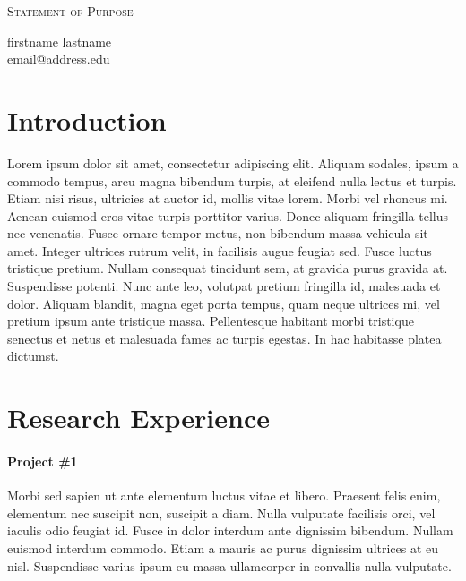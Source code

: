\documentclass[letterpaper]{article}
\makeatletter
\newcommand{\soptitle}{Statement of Purpose}
\newcommand{\yourname}{firstname lastname}
\newcommand{\youremail}{email@address.edu}
\newcommand{\amper}{{\fontspec[Scale=.95]{Adobe Caslon Pro}\selectfont\itshape\&~{}}}
\makeatother
\begin{document}
\begin{center}{\huge \scshape \soptitle}\end{center}
\begin{center}\vspace{0.2em} {\Large \yourname\\}
  {\youremail}\end{center}

\section*{Introduction}
Lorem ipsum dolor sit amet, consectetur adipiscing elit. Aliquam
sodales, ipsum a commodo tempus, arcu magna bibendum turpis, at
eleifend nulla lectus et turpis. Etiam nisi risus, ultricies at auctor
id, mollis vitae lorem. Morbi vel rhoncus mi. Aenean euismod eros
vitae turpis porttitor varius. Donec aliquam fringilla tellus nec
venenatis. Fusce ornare tempor metus, non bibendum massa vehicula sit
amet. Integer ultrices rutrum velit, in facilisis augue feugiat sed.
Fusce luctus tristique pretium. Nullam consequat tincidunt sem, at
gravida purus gravida at. Suspendisse potenti. Nunc ante leo, volutpat
pretium fringilla id, malesuada et dolor. Aliquam blandit, magna eget
porta tempus, quam neque ultrices mi, vel pretium ipsum ante tristique
massa. Pellentesque habitant morbi tristique senectus et netus et
malesuada fames ac turpis egestas. In hac habitasse platea dictumst.

\section*{Research Experience}
\paragraph{Project \#1}
Morbi sed sapien ut ante elementum luctus vitae et libero. Praesent
felis enim, elementum nec suscipit non, suscipit a diam. Nulla
vulputate facilisis orci, vel iaculis odio feugiat id. Fusce in dolor
interdum ante dignissim bibendum. Nullam euismod interdum commodo.
Etiam a mauris ac purus dignissim ultrices at eu nisl. Suspendisse
varius ipsum eu massa ullamcorper in convallis nulla vulputate.
\end{document}

